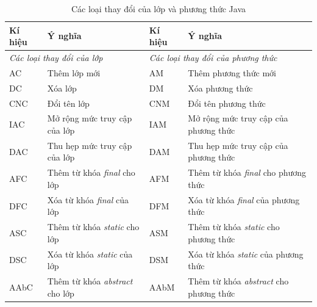 \documentclass[12pt]{report}
\begin{document}
\begin{table}[h]
	\centering
	\caption{Các loại thay đổi của lớp và phương thức Java}
	\label{tbl:class-method-changes}
	\begin{tabular}{|l|p{6cm}|l|p{6cm}|}
		\hline
		\textbf{Kí hiệu} & \textbf{Ý nghĩa}                                        & \textbf{Kí hiệu} & \textbf{Ý nghĩa}                                                \\ \hline
		\multicolumn{2}{|l|}{\textit{Các loại thay đổi của lớp}}                   & \multicolumn{2}{l|}{\textit{Các loại thay đổi của phương thức}}                    \\ \hline
		AC               & Thêm lớp mới                                            & AM               & Thêm phương thức mới                                            \\ \hline
		DC               & Xóa lớp                                                 & DM               & Xóa phương thức                                                 \\ \hline
		CNC              & Đổi tên lớp                                             & CNM              & Đổi tên phương thức                                             \\ \hline
		IAC              & Mở rộng mức truy cập của lớp                            & IAM              & Mở rộng mức truy cập của phương thức                            \\ \hline
		DAC              & Thu hẹp mức truy cập của lớp                            & DAM              & Thu hẹp mức truy cập của phương thức                            \\ \hline
		AFC              & Thêm từ khóa \textit{final} cho lớp    & AFM              & Thêm từ khóa \textit{final} cho phương thức    \\ \hline
		DFC              & Xóa từ khóa \textit{final} của lớp     & DFM              & Xóa từ khóa \textit{final} của phương thức     \\ \hline
		ASC              & Thêm từ khóa \textit{static} cho lớp   & ASM              & Thêm từ khóa \textit{static} cho phương thức   \\ \hline
		DSC              & Xóa từ khóa \textit{static} của lớp    & DSM              & Xóa từ khóa \textit{static} của phương thức    \\ \hline
		AAbC             & Thêm từ khóa \textit{abstract} cho lớp & AAbM             & Thêm từ khóa \textit{abstract} cho phương thức \\ \hline

\end{tabular}
\end{table}
\end{document}
